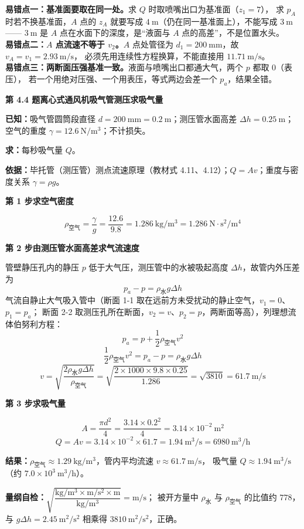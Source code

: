 \begin{yicuo}
\textbf{易错点一：基准面要取在同一处。}求 $Q$ 时取喷嘴出口为基准面（$z_1=7$），
求 $p_A$ 时若不换基准面，$A$ 点的 $z_A$ 就要写成 $4\ \mathrm{m}$（仍在同一基准面上），不能写成 $3\ \mathrm{m}$——
$3\ \mathrm{m}$ 是 $A$ 点在水面下的深度，是“液面与 $A$ 点的高差”，不是位置水头。\\
\textbf{易错点二：$A$ 点流速不等于 $v_2$。}$A$ 点处管径为 $d_1=200\ \mathrm{mm}$，故 $v_A=v_1=2.93\ \mathrm{m/s}$，
必须先用连续性方程换算，不能直接用 $11.71\ \mathrm{m/s}$。\\
\textbf{易错点三：两断面压强基准一致。}液面与喷嘴出口都通大气，两个 $p$ 都取 $0$（表压），
若一个用绝对压强、一个用表压，等式两边会差一个 $p_a$，结果全错。
\end{yicuo}

\noindent\textbf{第 4.4 题\quad 离心式通风机吸气管测压求吸气量}

\begin{jie}
\textbf{已知：}吸气管圆筒段直径 $d=200\ \mathrm{mm}=0.2\ \mathrm{m}$；测压管水面高差 $\Delta h=0.25\ \mathrm{m}$；
空气的重度 $\gamma=12.6\ \mathrm{N/m^3}$；不计损失。

\textbf{求：}每秒吸气量 $Q$。

\textbf{依据：}毕托管（测压管）测点流速原理（教材式 4.11、4.12）；$Q=Av$；重度与密度关系 $\gamma=\rho g$。

\textbf{第 1 步\quad 求空气密度}

\[ \rho_{\text{空气}}=\frac{\gamma}{g}=\frac{12.6}{9.8}=1.286\ \mathrm{kg/m^3}=1.286\ \mathrm{N\cdot s^2/m^4} \]

\textbf{第 2 步\quad 由测压管水面高差求气流速度}

管壁静压孔内的静压 $p$ 低于大气压，测压管中的水被吸起高度 $\Delta h$，故管内外压差为
\[ p_a-p=\rho_{\text{水}}g\Delta h \]
气流自静止大气吸入管中（断面 1-1 取在远前方未受扰动的静止空气，$v_1=0$、$p_1=p_a$；
断面 2-2 取测压孔所在断面，$v_2=v$、$p_2=p$，两断面等高），列理想流体伯努利方程：
\[ p_a=p+\frac{1}{2}\rho_{\text{空气}}v^2 \]
\[ \frac{1}{2}\rho_{\text{空气}}v^2=p_a-p=\rho_{\text{水}}g\Delta h \]
\[ v=\sqrt{\frac{2\rho_{\text{水}}g\Delta h}{\rho_{\text{空气}}}}
   =\sqrt{\frac{2\times1000\times9.8\times0.25}{1.286}}=\sqrt{3810}=61.7\ \mathrm{m/s} \]

\textbf{第 3 步\quad 求吸气量}

\[ A=\frac{\pi d^2}{4}=\frac{3.14\times0.2^2}{4}=3.14\times10^{-2}\ \mathrm{m^2} \]
\[ Q=Av=3.14\times10^{-2}\times61.7=1.94\ \mathrm{m^3/s}=6980\ \mathrm{m^3/h} \]

\textbf{结果：}$\rho_{\text{空气}}\approx1.29\ \mathrm{kg/m^3}$，管内平均流速 $v\approx61.7\ \mathrm{m/s}$，
吸气量 $Q\approx1.94\ \mathrm{m^3/s}$（约 $7.0\times10^3\ \mathrm{m^3/h}$）。

\textbf{量纲自检：}$\sqrt{\dfrac{\mathrm{kg/m^3\times m/s^2\times m}}{\mathrm{kg/m^3}}}=\mathrm{m/s}$；
被开方量中 $\rho_{\text{水}}$ 与 $\rho_{\text{空气}}$ 的比值约 $778$，与 $g\Delta h=2.45\ \mathrm{m^2/s^2}$ 相乘得 $3810\ \mathrm{m^2/s^2}$，正确。
\end{jie}

